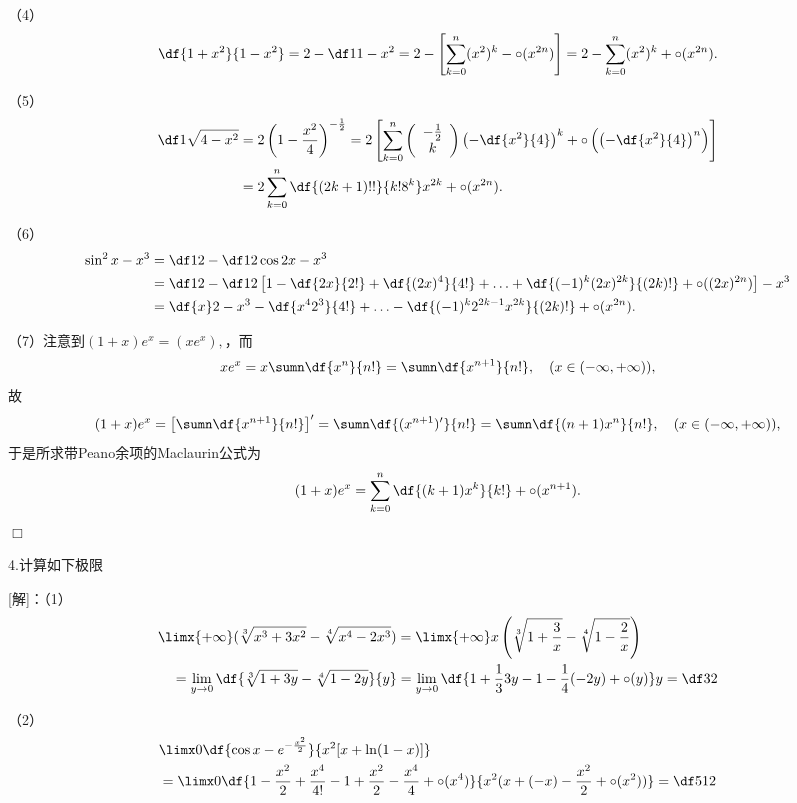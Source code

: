 （4）
$$
	\df{1+x^2}{1-x^2}
	=2-\df1{1-x^2}
	=2-\left[\sum\limits_{k=0}^n(x^2)^k-\circ(x^{2n})\right]
	=2-\sum\limits_{k=0}^n(x^2)^k+\circ(x^{2n}).
$$

（5）
\begin{align*}
	\df1{\sqrt{4-x^2}}
	&=2\left(1-\frac{x^2}4\right)^{-\frac12}
	=2\left[\sum\limits_{k=0}^n\left(\begin{array}{c}
		-\frac12 \\ k
	\end{array}\right)\left(-\df{x^2}{4}\right)^k
	+\circ\left(\left(-\df{x^2}{4}\right)^n\right)
	\right]\\
	&=2\sum\limits_{k=0}^n\df{(2k+1)!!}{k!8^k}x^{2k}
	+\circ(x^{2n}).
\end{align*}

（6）
\begin{align*}
	\sin^2x-x^3&=\df12-\df12\cos2x-x^3\\
	&=\df12-\df12\left[1-\df{2x}{2!}+\df{(2x)^4}{4!}
	+\ldots+\df{(-1)^k(2x)^{2k}}{(2k)!}+\circ((2x)^{2n})\right]-x^3\\
	&=\df{x}2-x^3-\df{x^42^3}{4!}
	+\ldots-\df{(-1)^k2^{2k-1}x^{2k}}{(2k)!}+\circ(x^{2n}).
\end{align*}

（7）注意到$(1+x)e^x=(xe^x),$，而
$$xe^x=x\sumn\df{x^n}{n!}=\sumn\df{x^{n+1}}{n!},
\quad(x\in(-\infty,+\infty)),$$
故
$$(1+x)e^x=\left[\sumn\df{x^{n+1}}{n!}\right]'
=\sumn\df{(x^{n+1})'}{n!}
=\sumn\df{(n+1)x^n}{n!},
\quad(x\in(-\infty,+\infty)),$$
于是所求带Peano余项的Maclaurin公式为
$$(1+x)e^x=\sum\limits_{k=0}^n\df{(k+1)x^k}{k!}+\circ(x^{n+1}).$$
\hfill$\Box$

\bigskip

4.计算如下极限

[解]：（1）
\begin{align*}
	&\limx{+\infty}(\sqrt[3]{x^3+3x^2}-\sqrt[4]{x^4-2x^3})
	=\limx{+\infty}x\left(\sqrt[3]{1+\frac3x}
	-\sqrt[4]{1-\frac2x}\right)\\
	&\quad =\lim\limits_{y\to0}\df{\sqrt[3]{1+3y}
	-\sqrt[4]{1-2y}}{y}
	=\lim\limits_{y\to0}\df{1+\frac133y-1-\frac14(-2y)+\circ(y)}y=\df32
\end{align*}

（2）
\begin{align*}
	&\limx0\df{\cos x-e^{-\frac{x^2}2}}{x^2[x+\ln(1-x)]}\\
	&=\limx0\df{1-\frac{x^2}2+\frac{x^4}{4!}-1+\frac{x^2}2
	-\frac{x^4}{4}+\circ(x^4)}{x^2(x+(-x)-\frac{x^2}2+\circ(x^2))}
	=\df5{12}
\end{align*}

